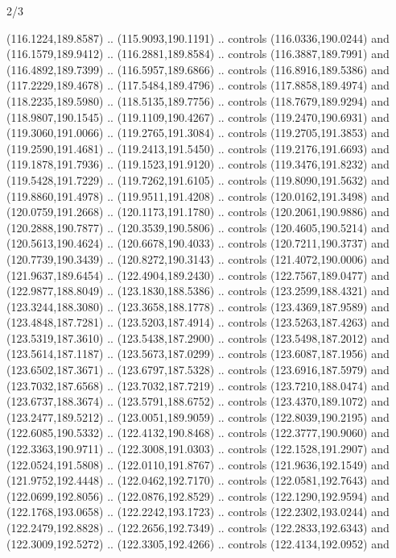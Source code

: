 \begin{flagdescription}{2/3}
\begin{scope}[shift={(0.5\flaglength,0.5)},scale=\flagwidth/320]
\begin{scope}[y=0.8pt, x=0.8pt, yscale=-1,shift={(-118.3,-146)}]
  (116.1224,189.8587) .. (115.9093,190.1191) .. controls (116.0336,190.0244) and
  (116.1579,189.9412) .. (116.2881,189.8584) .. controls (116.3887,189.7991) and
  (116.4892,189.7399) .. (116.5957,189.6866) .. controls (116.8916,189.5386) and
  (117.2229,189.4678) .. (117.5484,189.4796) .. controls (117.8858,189.4974) and
  (118.2235,189.5980) .. (118.5135,189.7756) .. controls (118.7679,189.9294) and
  (118.9807,190.1545) .. (119.1109,190.4267) .. controls (119.2470,190.6931) and
  (119.3060,191.0066) .. (119.2765,191.3084) .. controls (119.2705,191.3853) and
  (119.2590,191.4681) .. (119.2413,191.5450) .. controls (119.2176,191.6693) and
  (119.1878,191.7936) .. (119.1523,191.9120) .. controls (119.3476,191.8232) and
  (119.5428,191.7229) .. (119.7262,191.6105) .. controls (119.8090,191.5632) and
  (119.8860,191.4978) .. (119.9511,191.4208) .. controls (120.0162,191.3498) and
  (120.0759,191.2668) .. (120.1173,191.1780) .. controls (120.2061,190.9886) and
  (120.2888,190.7877) .. (120.3539,190.5806) .. controls (120.4605,190.5214) and
  (120.5613,190.4624) .. (120.6678,190.4033) .. controls (120.7211,190.3737) and
  (120.7739,190.3439) .. (120.8272,190.3143) .. controls (121.4072,190.0006) and
  (121.9637,189.6454) .. (122.4904,189.2430) .. controls (122.7567,189.0477) and
  (122.9877,188.8049) .. (123.1830,188.5386) .. controls (123.2599,188.4321) and
  (123.3244,188.3080) .. (123.3658,188.1778) .. controls (123.4369,187.9589) and
  (123.4848,187.7281) .. (123.5203,187.4914) .. controls (123.5263,187.4263) and
  (123.5319,187.3610) .. (123.5438,187.2900) .. controls (123.5498,187.2012) and
  (123.5614,187.1187) .. (123.5673,187.0299) .. controls (123.6087,187.1956) and
  (123.6502,187.3671) .. (123.6797,187.5328) .. controls (123.6916,187.5979) and
  (123.7032,187.6568) .. (123.7032,187.7219) .. controls (123.7210,188.0474) and
  (123.6737,188.3674) .. (123.5791,188.6752) .. controls (123.4370,189.1072) and
  (123.2477,189.5212) .. (123.0051,189.9059) .. controls (122.8039,190.2195) and
  (122.6085,190.5332) .. (122.4132,190.8468) .. controls (122.3777,190.9060) and
  (122.3363,190.9711) .. (122.3008,191.0303) .. controls (122.1528,191.2907) and
  (122.0524,191.5808) .. (122.0110,191.8767) .. controls (121.9636,192.1549) and
  (121.9752,192.4448) .. (122.0462,192.7170) .. controls (122.0581,192.7643) and
  (122.0699,192.8056) .. (122.0876,192.8529) .. controls (122.1290,192.9594) and
  (122.1768,193.0658) .. (122.2242,193.1723) .. controls (122.2302,193.0244) and
  (122.2479,192.8828) .. (122.2656,192.7349) .. controls (122.2833,192.6343) and
  (122.3009,192.5272) .. (122.3305,192.4266) .. controls (122.4134,192.0952) and

\end{scope}
\end{scope}
\end{flagdescription}

